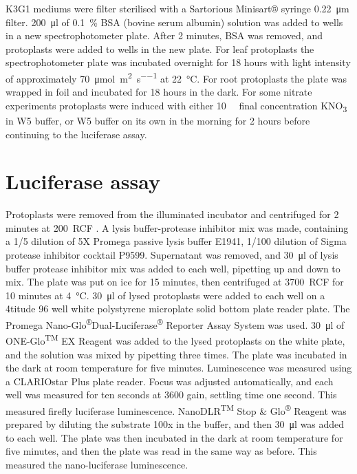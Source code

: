 \documentclass[../main.tex]{subfiles}
\begin{document}
K3G1 mediums were filter sterilised with a Sartorious Minisart® syringe \SI{0.22}{\um} filter.
\SI{200}{\micro\litre} of \SI{0.1}{\percent} BSA (bovine serum albumin) solution was added to wells in a new spectrophotometer plate.
After 2 minutes, BSA was removed, and protoplasts were added to wells in the new plate.
For leaf protoplasts the spectrophotometer plate was incubated overnight for 18 hours with light intensity of approximately \SI{70}{\umol\per\square\meter\per\s} at \SI{22}{\degreeCelsius}.
For root protoplasts the plate was wrapped in foil and incubated for 18 hours in the dark.
For some nitrate experiments protoplasts were induced with either \SI{10}{\milli\Molar} final concentration KNO\textsubscript{3} in W5 buffer, or W5 buffer on its own in the morning for 2 hours before continuing to the luciferase assay.

\section{Luciferase assay}\label{chapter2:methods:luciferase-assay}

Protoplasts were removed from the illuminated incubator and centrifuged for 2 minutes at 200~RCF .
A lysis buffer\hyp{}protease inhibitor mix was made, containing a 1/5 dilution of 5X Promega passive lysis buffer E1941, 1/100 dilution of Sigma protease inhibitor cocktail P9599.
Supernatant was removed, and \SI{30}{\micro\litre} of lysis buffer protease inhibitor mix was added to each well, pipetting up and down to mix.
The plate was put on ice for 15 minutes, then centrifuged at 3700~RCF for 10 minutes at \SI{4}{\degreeCelsius}.
\SI{30}{\micro\litre} of lysed protoplasts were added to each well on a 4titude 96 well white polystyrene microplate solid bottom plate reader plate. 
The Promega Nano\hyp{}Glo\textsuperscript{®}Dual\hyp{}Luciferase\textsuperscript{®} Reporter Assay System was used.
\SI{30}{\micro\litre} of ONE\hyp{}Glo\textsuperscript{TM} EX Reagent was added to the lysed protoplasts on the white plate, and the solution was mixed by pipetting three times.
The plate was incubated in the dark at room temperature for five minutes. Luminescence was measured using a CLARIOstar Plus plate reader.
Focus was adjusted automatically, and each well was measured for ten seconds at 3600 gain, settling time one second.
This measured firefly luciferase luminescence.
NanoDLR\textsuperscript{TM} Stop \& Glo\textsuperscript{®} Reagent was prepared by diluting the substrate 100x in the buffer, and then \SI{30}{\micro\litre} was added to each well.
The plate was then incubated in the dark at room temperature for five minutes, and then the plate was read in the same way as before.
This measured the nano\hyp{}luciferase luminescence.
\end{document}

